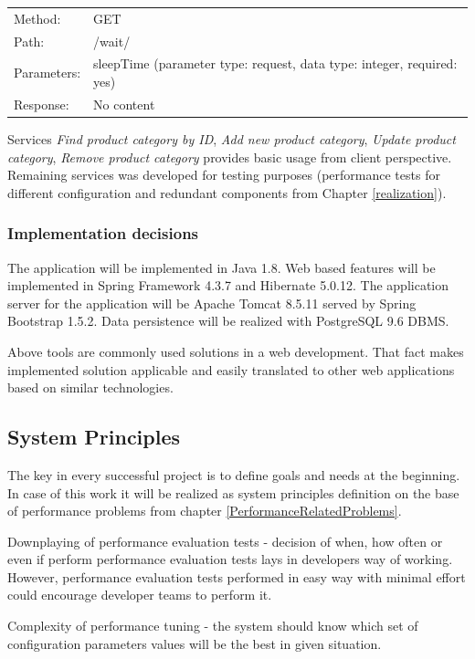 \documentclass[10pt,a4paper]{article}
\begin{document}
{\renewcommand{\arraystretch}{1}
  \begin{tabular}{ll}
  Method: & GET \\
  Path: & /wait/ \\
  Parameters: & sleepTime (parameter type: request, data type: integer, required: yes)\\
  Response: & No content  \\
  \end{tabular} \vspace{5mm}
}
  
Services \textit{Find product category by ID}, \textit{Add new product category}, \textit{Update product category}, \textit{Remove product category} provides basic usage from client perspective. Remaining services was developed for testing purposes (performance tests for different configuration and redundant components from Chapter \ref{realization}).
  
\subsubsection{Implementation decisions} 
The application will be implemented in Java 1.8. Web based features will be implemented in Spring Framework 4.3.7 and Hibernate 5.0.12. The application server for the application will be Apache Tomcat 8.5.11 served by Spring Bootstrap 1.5.2. Data persistence will be realized with PostgreSQL 9.6 DBMS.  

Above tools are commonly used solutions in a web development. That fact makes implemented solution applicable and easily translated to other web applications based on similar technologies.  

\subsection{System Principles} \label{principles}
The key in every successful project is to define goals and needs at the beginning.
In case of this work it will be realized as system principles definition on the base of  performance problems from chapter \ref{PerformanceRelatedProblems}.

Downplaying of performance evaluation tests - decision of when, how often or even if perform performance evaluation tests lays in developers way of working. However, performance evaluation tests performed in easy way with minimal effort could encourage developer teams to perform it. 

Complexity of performance tuning - the system should know which set of configuration parameters values will be the best in given situation.  
\end{document}

